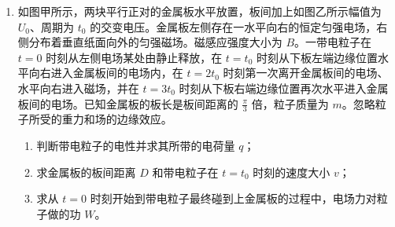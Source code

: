 \documentclass[\gkver]{gaokaozhenti}
\begin{document}
\begin{enumerate}
{$\left(mg+F_{N}\right)\tan\theta=ma$

解得 $\tan\theta=\frac{ma}{mg+F_{N}}$

（2）①由图像可知碰撞过程中 $F$ 的冲量大小

$I_{F}=\frac{1}{2}\times0.1\times6600 \UNs=330 \UNs$

方向竖直向上；

②头锤落到气囊上时的速度

$v_{0}=\sqrt{2gH}=8 \Ums$

与气囊作用过程由动量定理（向上为正方向）

$I_{F}-Mgt=Mv-(-Mv_{0})$

解得 $v=2 \Ums$

则上升的最大高度

$h=\frac{v^{2}}{2g}=0.2 \Um$。
}

\item
如图甲所示，两块平行正对的金属板水平放置，板间加上如图乙所示幅值为 $U_{0}$、周期为 $t_{0}$ 的交变电压。金属板左侧存在一水平向右的恒定匀强电场，右侧分布着垂直纸面向外的匀强磁场。磁感应强度大小为 $B$。一带电粒子在 $t = 0$ 时刻从左侧电场某处由静止释放，在 $t = t_{0}$ 时刻从下板左端边缘位置水平向右进入金属板间的电场内，在 $t = 2t_{0}$ 时刻第一次离开金属板间的电场、水平向右进入磁场，并在 $t = 3t_{0}$ 时刻从下板右端边缘位置再次水平进入金属板间的电场。已知金属板的板长是板间距离的 $\frac{\pi}{3}$ 倍，粒子质量为 $m$。忽略粒子所受的重力和场的边缘效应。
\begin{enumerate}
	\item
	判断带电粒子的电性并求其所带的电荷量 $q$；
	\item
	求金属板的板间距离 $D$ 和带电粒子在 $t = t_{0}$ 时刻的速度大小 $v$；
	\item
	求从 $t = 0$ 时刻开始到带电粒子最终碰到上金属板的过程中，电场力对粒子做的功 $W$。
\end{enumerate}
\end{enumerate}
\end{document}
